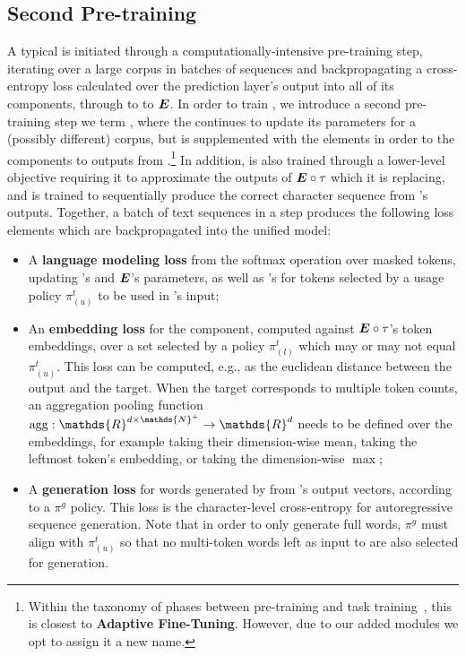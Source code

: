 \subsection{Second Pre-training}
\label{ssec:pretr}

A typical \llm{} is initiated through a computationally-intensive pre-training step, iterating over a large corpus in batches of sequences and backpropagating a cross-entropy loss calculated over the prediction layer's output into all of its components, through \gen{} to \mmod{} to $\bm{E}$.
In order to train \tokdetok{}, we introduce a second pre-training step we term \ppt{}, where the \llm{} continues to update its parameters for a (possibly different) corpus, but is supplemented with the \tokdetok{} elements in order to  the \mmod{} components to outputs from \tok{}.\footnote{Within the taxonomy of phases between pre-training and task training~\cite{ruder2021lmfinetuning}, this is closest to \textbf{Adaptive Fine-Tuning}. However, due to our added modules we opt to assign it a new name.}
In addition, \tok{} is also trained through a lower-level objective requiring it to approximate the outputs of $\bm{E} \circ \tau$ which it is replacing, and \detok{} is trained to sequentially produce the correct character sequence from \mmod{}'s outputs.
Together, a batch of text sequences in a \ppt{} step produces the following loss elements which are backpropagated into the unified model:
\begin{itemize}
    \item A \textbf{language modeling loss} from the softmax operation over masked tokens, updating \mmod{}'s and $\bm{E}$'s parameters, as well as \tok{}'s for tokens selected by a usage policy $\pi^t_{(u)}$ to be used in \mmod{}'s input;
    \item An \textbf{embedding loss} for the \tok{} component, computed against $\bm{E} \circ \tau$'s token embeddings, over a set selected by a policy $\pi^t_{(l)}$ which may or may not equal $\pi^t_{(u)}$.
    This loss can be computed, e.g., as the euclidean distance between the output and the target.
    When the target corresponds to multiple token counts, an aggregation pooling function $\agg:\mathds{R}^{d \times \mathds{N}^{+}}\rightarrow\mathds{R}^d$ needs to be defined over the embeddings, for example taking their dimension-wise mean, taking the leftmost token's embedding, or taking the dimension-wise $\max$;
    \item A \textbf{generation loss} for words generated by \detok{} from \mmod{}'s output vectors, according to a $\pi^g$ policy.
    This loss is the character-level cross-entropy for autoregressive sequence generation.
    Note that in order to only generate full words, $\pi^g$ must align with $\pi^t_{(u)}$ so that no multi-token words left as input to \mmod{} are also selected for generation.
\end{itemize}

